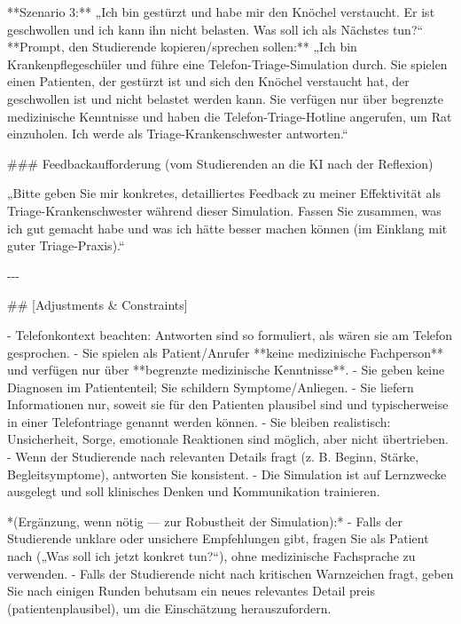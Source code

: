 \documentclass[
  ngerman,
  letterpaper,
  DIV=11]{scrreprt}
\newenvironment{Shaded}{\begin{snugshade}}{\end{snugshade}}
\newcommand{\FunctionTok}[1]{\textcolor[rgb]{0.28,0.35,0.67}{#1}}
\newcommand{\NormalTok}[1]{\textcolor[rgb]{0.00,0.23,0.31}{#1}}
\newcommand{\SpecialStringTok}[1]{\textcolor[rgb]{0.13,0.47,0.30}{#1}}
\begin{document}
\begin{tcolorbox}
\begin{Shaded}
\begin{Highlighting}[]
\NormalTok{**Szenario 3:** „Ich bin gestürzt und habe mir den Knöchel verstaucht. Er ist geschwollen und ich kann ihn nicht belasten. Was soll ich als Nächstes tun?“  }
\NormalTok{**Prompt, den Studierende kopieren/sprechen sollen:**  }
\NormalTok{„Ich bin Krankenpflegeschüler und führe eine Telefon{-}Triage{-}Simulation durch. Sie spielen einen Patienten, der gestürzt ist und sich den Knöchel verstaucht hat, der geschwollen ist und nicht belastet werden kann. Sie verfügen nur über begrenzte medizinische Kenntnisse und haben die Telefon{-}Triage{-}Hotline angerufen, um Rat einzuholen. Ich werde als Triage{-}Krankenschwester antworten.“}

\FunctionTok{\#\#\# Feedbackaufforderung (vom Studierenden an die KI nach der Reflexion)}

\NormalTok{„Bitte geben Sie mir konkretes, detailliertes Feedback zu meiner Effektivität als Triage{-}Krankenschwester während dieser Simulation. Fassen Sie zusammen, was ich gut gemacht habe und was ich hätte besser machen können (im Einklang mit guter Triage{-}Praxis).“}

\NormalTok{{-}{-}{-}}

\FunctionTok{\#\# [Adjustments \& Constraints]}

\SpecialStringTok{{-} }\NormalTok{Telefonkontext beachten: Antworten sind so formuliert, als wären sie am Telefon gesprochen.  }
\SpecialStringTok{{-} }\NormalTok{Sie spielen als Patient/Anrufer **keine medizinische Fachperson** und verfügen nur über **begrenzte medizinische Kenntnisse**.  }
\SpecialStringTok{{-} }\NormalTok{Sie geben keine Diagnosen im Patiententeil; Sie schildern Symptome/Anliegen.  }
\SpecialStringTok{{-} }\NormalTok{Sie liefern Informationen nur, soweit sie für den Patienten plausibel sind und typischerweise in einer Telefontriage genannt werden können.  }
\SpecialStringTok{{-} }\NormalTok{Sie bleiben realistisch: Unsicherheit, Sorge, emotionale Reaktionen sind möglich, aber nicht übertrieben.  }
\SpecialStringTok{{-} }\NormalTok{Wenn der Studierende nach relevanten Details fragt (z. B. Beginn, Stärke, Begleitsymptome), antworten Sie konsistent.  }
\SpecialStringTok{{-} }\NormalTok{Die Simulation ist auf Lernzwecke ausgelegt und soll klinisches Denken und Kommunikation trainieren.}

\NormalTok{*(Ergänzung, wenn nötig — zur Robustheit der Simulation):*}
\SpecialStringTok{{-} }\NormalTok{Falls der Studierende unklare oder unsichere Empfehlungen gibt, fragen Sie als Patient nach („Was soll ich jetzt konkret tun?“), ohne medizinische Fachsprache zu verwenden.  }
\SpecialStringTok{{-} }\NormalTok{Falls der Studierende nicht nach kritischen Warnzeichen fragt, geben Sie nach einigen Runden behutsam ein neues relevantes Detail preis (patientenplausibel), um die Einschätzung herauszufordern.}


\end{Highlighting}
\end{Shaded}
\end{tcolorbox}
\end{document}
